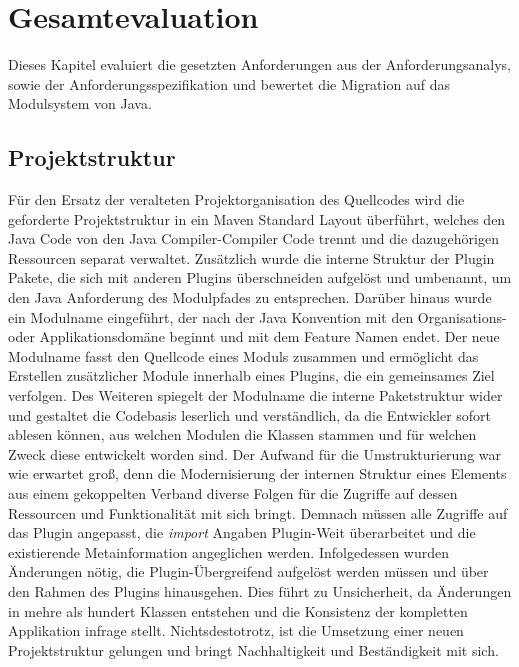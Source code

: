 \chapter{Gesamtevaluation}
Dieses Kapitel evaluiert die gesetzten Anforderungen aus der Anforderungsanalys, sowie der Anforderungsspezifikation und bewertet die Migration auf das Modulsystem von Java.\bigbreak

\section{Projektstruktur}
Für den Ersatz der veralteten Projektorganisation des Quellcodes wird die geforderte Projektstruktur in ein Maven Standard Layout überführt, welches den Java Code von den Java Compiler-Compiler Code trennt und die dazugehörigen Ressourcen separat verwaltet. Zusätzlich wurde die interne Struktur der Plugin Pakete, die sich mit anderen Plugins überschneiden aufgelöst und umbenannt, um den Java Anforderung des Modulpfades zu entsprechen. Darüber hinaus wurde ein Modulname eingeführt, der nach der Java Konvention mit den Organisations- oder Applikationsdomäne beginnt und mit dem Feature Namen endet. Der neue Modulname fasst den Quellcode eines Moduls zusammen und ermöglicht das Erstellen zusätzlicher Module innerhalb eines Plugins, die ein gemeinsames Ziel verfolgen. Des Weiteren spiegelt der Modulname die interne Paketstruktur wider und gestaltet die Codebasis leserlich und verständlich, da die Entwickler sofort ablesen können, aus welchen Modulen die Klassen stammen und für welchen Zweck diese entwickelt worden sind.\newline
Der Aufwand für die Umstrukturierung war wie erwartet groß, denn die Modernisierung der internen Struktur eines Elements aus einem gekoppelten Verband diverse Folgen für die Zugriffe auf dessen Ressourcen und Funktionalität mit sich bringt. Demnach müssen alle Zugriffe auf das Plugin angepasst, die \textit{import} Angaben Plugin-Weit überarbeitet und die existierende Metainformation angeglichen werden. Infolgedessen wurden Änderungen nötig, die Plugin-Übergreifend aufgelöst werden müssen und über den Rahmen des Plugins hinausgehen. Dies führt zu Unsicherheit, da Änderungen in mehre als hundert Klassen entstehen und die Konsistenz der kompletten Applikation infrage stellt. \newline
Nichtsdestotrotz, ist die Umsetzung einer neuen Projektstruktur gelungen und bringt Nachhaltigkeit und Beständigkeit mit sich.\bigbreak

